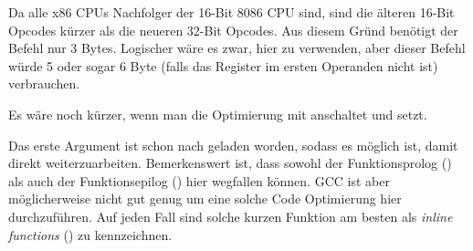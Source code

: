 Da alle x86 CPUs Nachfolger der 16-Bit 8086 CPU sind, sind die älteren 16-Bit
Opcodes kürzer als die neueren 32-Bit Opcodes.
Aus diesem Gründ benötigt der Befehl  nur 3 Bytes. Logischer
wäre es zwar, hier  zu verwenden, aber dieser Befehl würde 5
oder sogar 6 Byte (falls das Register im ersten Operanden nicht \EAX ist)
verbrauchen.

Es wäre noch kürzer, wenn man die Optimierung mit \Othree anschaltet und
 setzt.



Das erste Argument ist schon nach \EAX geladen worden, sodass es möglich ist,
damit direkt weiterzuarbeiten. Bemerkenswert ist, dass sowohl der
Funktionsprolog () als auch der Funktionsepilog
() hier wegfallen können. GCC ist aber möglicherweise nicht gut
genug um eine solche Code Optimierung hier durchzuführen. Auf jeden Fall sind
solche kurzen Funktion am besten als \emph{inline functions}
() zu kennzeichnen.
